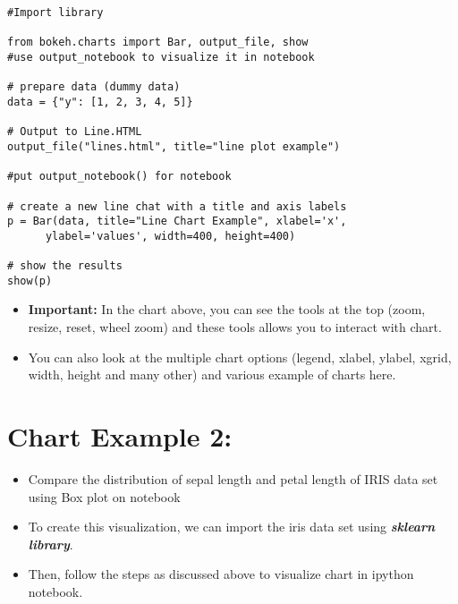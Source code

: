 \documentclass[a4paper,12pt]{article}
\begin{document}
%
%
%
%

\newpage

\begin{framed}
\begin{verbatim}
#Import library

from bokeh.charts import Bar, output_file, show 
#use output_notebook to visualize it in notebook

# prepare data (dummy data)
data = {"y": [1, 2, 3, 4, 5]}

# Output to Line.HTML
output_file("lines.html", title="line plot example") 

#put output_notebook() for notebook

# create a new line chat with a title and axis labels
p = Bar(data, title="Line Chart Example", xlabel='x', 
      ylabel='values', width=400, height=400)

# show the results
show(p)
\end{verbatim}
\end{framed}
\newpage
\begin{itemize}
\item \textbf{Important:} In the chart above,  you can see the tools at the top (zoom, resize, reset, wheel zoom) and these 
tools allows you to interact with chart. 
\item You can also look at the multiple chart options (legend, xlabel, ylabel, xgrid, width, height and many other) and 
various example of charts here.
\end{itemize}

\newpage


\section*{Chart Example 2: }
\begin{itemize}
\item Compare the distribution of sepal length and petal length of IRIS data set using 
Box plot on notebook

\item To create this visualization, we can import the iris data set using \textbf{\textit{sklearn library}}. 
\item Then, 
follow the steps as discussed above to visualize chart in ipython notebook.

\end{itemize}
\end{document}
